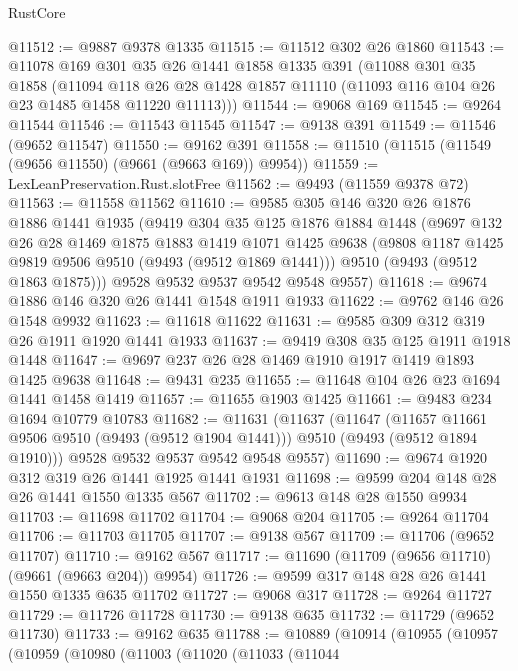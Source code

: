 \begin{lexlean}{RustCore}
\begin{coremodule}
@11512 := @9887 @9378 @1335
@11515 := @11512 @302 @26 @1860
@11543 := @11078
    @169
    @301
    @35
    @26
    @1441
    @1858
    @1335
    @391
    (@11088
      @301
      @35
      @1858
      (@11094 @118 @26 @28 @1428 @1857 @11110 (@11093 @116 @104 @26 @23 @1485 @1458 @11220 @11113)))
@11544 := @9068 @169
@11545 := @9264 @11544
@11546 := @11543 @11545
@11547 := @9138 @391
@11549 := @11546 (@9652 @11547)
@11550 := @9162 @391
@11558 := @11510 (@11515 (@11549 (@9656 @11550) (@9661 (@9663 @169)) @9954))
@11559 := LexLeanPreservation.Rust.slotFree
@11562 := @9493 (@11559 @9378 @72)
@11563 := @11558 @11562
@11610 := @9585
    @305
    @146
    @320
    @26
    @1876
    @1886
    @1441
    @1935
    (@9419
      @304
      @35
      @125
      @1876
      @1884
      @1448
      (@9697
        @132
        @26
        @28
        @1469
        @1875
        @1883
        @1419
        @1071
        @1425
        @9638
        (@9808 @1187 @1425 @9819 @9506 @9510 (@9493 (@9512 @1869 @1441)))
        @9510
        (@9493 (@9512 @1863 @1875)))
      @9528
      @9532
      @9537
      @9542
      @9548
      @9557)
@11618 := @9674 @1886 @146 @320 @26 @1441 @1548 @1911 @1933
@11622 := @9762 @146 @26 @1548 @9932
@11623 := @11618 @11622
@11631 := @9585 @309 @312 @319 @26 @1911 @1920 @1441 @1933
@11637 := @9419 @308 @35 @125 @1911 @1918 @1448
@11647 := @9697 @237 @26 @28 @1469 @1910 @1917 @1419 @1893 @1425 @9638
@11648 := @9431 @235
@11655 := @11648 @104 @26 @23 @1694 @1441 @1458 @1419
@11657 := @11655 @1903 @1425
@11661 := @9483 @234 @1694 @10779 @10783
@11682 := @11631
    (@11637
      (@11647
        (@11657 @11661 @9506 @9510 (@9493 (@9512 @1904 @1441)))
        @9510
        (@9493 (@9512 @1894 @1910)))
      @9528
      @9532
      @9537
      @9542
      @9548
      @9557)
@11690 := @9674 @1920 @312 @319 @26 @1441 @1925 @1441 @1931
@11698 := @9599 @204 @148 @28 @26 @1441 @1550 @1335 @567
@11702 := @9613 @148 @28 @1550 @9934
@11703 := @11698 @11702
@11704 := @9068 @204
@11705 := @9264 @11704
@11706 := @11703 @11705
@11707 := @9138 @567
@11709 := @11706 (@9652 @11707)
@11710 := @9162 @567
@11717 := @11690 (@11709 (@9656 @11710) (@9661 (@9663 @204)) @9954)
@11726 := @9599 @317 @148 @28 @26 @1441 @1550 @1335 @635 @11702
@11727 := @9068 @317
@11728 := @9264 @11727
@11729 := @11726 @11728
@11730 := @9138 @635
@11732 := @11729 (@9652 @11730)
@11733 := @9162 @635
@11788 := @10889
    (@10914
      (@10955
        (@10957
          (@10959
            (@10980
              (@11003
                (@11020
                  (@11033
                    (@11044

\end{coremodule}
\end{lexlean}
